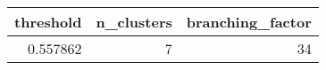 \begin{tabular}{rrr}
\toprule
threshold & n_clusters & branching_factor \\
\midrule
0.557862 & 7 & 34 \\
\bottomrule
\end{tabular}
